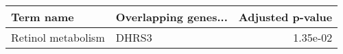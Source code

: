 \begin{tabular}{llr}
\toprule
         Term name & Overlapping genes... &  Adjusted p-value \\
\midrule
Retinol metabolism &                DHRS3 &          1.35e-02 \\
\bottomrule
\end{tabular}
